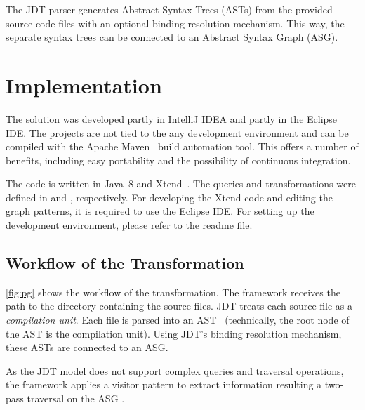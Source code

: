 \documentclass[submission,copyright,creativecommons]{eptcs}
\begin{document}
The JDT parser generates Abstract Syntax Trees (ASTs) from the provided source code files with an optional binding resolution mechanism. This way, the separate syntax trees can be connected to an Abstract Syntax Graph (ASG).



\section{Implementation}

The solution was developed partly in IntelliJ IDEA and partly in the Eclipse IDE. The projects are not tied to the any development environment and can be compiled with the Apache Maven~\cite{Maven} build automation tool. This offers a number of benefits, including easy portability and the possibility of continuous integration.

The code is written in Java~8 and Xtend~\cite{Xtend}. The queries and transformations were defined in \eiq and \viatra, respectively. For developing the Xtend code and editing the graph patterns, it is required to use the Eclipse IDE. For setting up the development environment, please refer to the readme file. 

\subsection{Workflow of the Transformation}


\autoref{fig:pg} shows the workflow of the transformation. The framework receives the path to the directory containing the source files. JDT treats each source file as a \emph{compilation unit}. Each file is parsed into an AST~ (technically, the root node of the AST is the compilation unit). Using JDT's binding resolution mechanism, these ASTs are connected to an ASG.

As the JDT model does not support complex queries and traversal operations, the framework applies a visitor pattern to extract information resulting a two-pass traversal on the ASG .
\end{document}
